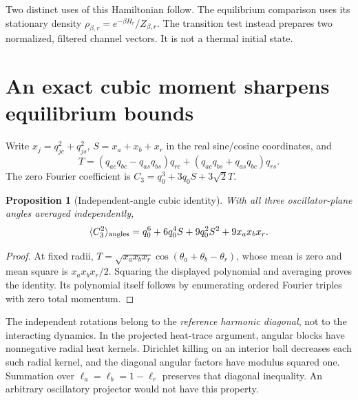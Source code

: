 \documentclass[11pt]{article}
\newtheorem{proposition}[theorem]{Proposition}
\begin{document}
Two distinct uses of this Hamiltonian follow. The equilibrium comparison
uses its stationary density $\rho_{\beta,r}=e^{-\beta H_r}/Z_{\beta,r}$.
The transition test instead prepares two normalized, filtered channel
vectors. It is not a thermal initial state.

\section{An exact cubic moment sharpens equilibrium bounds}
Write $x_j=q_{jc}^2+q_{js}^2$, $S=x_a+x_b+x_r$ in the real sine/cosine
coordinates, and
\[
 T=(q_{ac}q_{bc}-q_{as}q_{bs})q_{rc}
    +(q_{ac}q_{bs}+q_{as}q_{bc})q_{rs}.
\]
The zero Fourier coefficient is $C_3=q_0^3+3q_0S+3\sqrt2T$.

\begin{proposition}[Independent-angle cubic identity]\label{prop:cubic}
With all three oscillator-plane angles averaged independently,
\begin{equation}
 \langle C_3^2\rangle_{\rm angles}
 =q_0^6+6q_0^4S+9q_0^2S^2+9x_ax_bx_r.
 \label{eq:cubic}
\end{equation}
\end{proposition}
\begin{proof}
At fixed radii,
$T=\sqrt{x_ax_bx_r}\cos(\theta_a+\theta_b-\theta_r)$, whose mean is
zero and mean square is $x_ax_bx_r/2$. Squaring the displayed polynomial
and averaging proves the identity. Its polynomial itself follows by
enumerating ordered Fourier triples with zero total momentum.
\end{proof}

The independent rotations belong to the \emph{reference harmonic diagonal},
not to the interacting dynamics. In the projected heat-trace argument,
angular blocks have nonnegative radial heat kernels. Dirichlet killing on
an interior ball decreases each such radial kernel, and the diagonal
angular factors have modulus squared one. Summation over
$\ell_a=\ell_b=1-\ell_r$ preserves that diagonal inequality. An arbitrary
oscillatory projector would not have this property.
\end{document}
